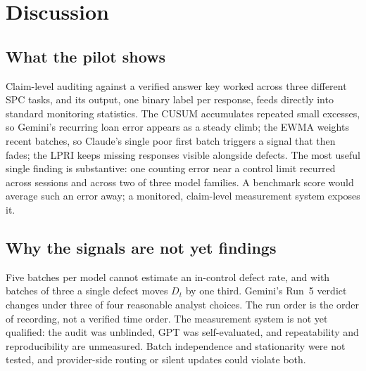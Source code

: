 \documentclass[11pt]{article}
\begin{document}
\section{Discussion}
\subsection{What the pilot shows}
Claim-level auditing against a verified answer key worked across three different SPC tasks, and its output, one binary label per response, feeds directly into standard monitoring statistics. The CUSUM accumulates repeated small excesses, so Gemini's recurring loan error appears as a steady climb; the EWMA weights recent batches, so Claude's single poor first batch triggers a signal that then fades; the LPRI keeps missing responses visible alongside defects. The most useful single finding is substantive: one counting error near a control limit recurred across sessions and across two of three model families. A benchmark score would average such an error away; a monitored, claim-level measurement system exposes it.

\subsection{Why the signals are not yet findings}
Five batches per model cannot estimate an in-control defect rate, and with batches of three a single defect moves $D_t$ by one third. Gemini's Run~5 verdict changes under three of four reasonable analyst choices. The run order is the order of recording, not a verified time order. The measurement system is not yet qualified: the audit was unblinded, GPT was self-evaluated, and repeatability and reproducibility are unmeasured. Batch independence and stationarity were not tested, and provider-side routing or silent updates could violate both.
\end{document}
